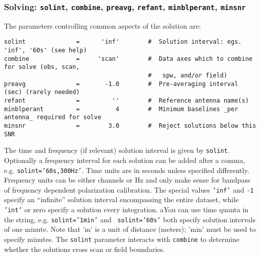 \subsubsection{Solving: {\tt solint}, {\tt combine},
{\tt preavg}, {\tt refant}, {\tt minblperant}, {\tt minsnr} }
\label{section:cal.solve.pars.solving}

The parameters controlling common aspects of the solution are:
\small
\begin{verbatim}
solint              =      'inf'        #  Solution interval: egs. 'inf', '60s' (see help)
combine             =     'scan'        #  Data axes which to combine for solve (obs, scan, 
                                        #   spw, and/or field)
preavg              =       -1.0        #  Pre-averaging interval (sec) (rarely needed)
refant              =         ''        #  Reference antenna name(s)
minblperant         =          4        #  Minimum baselines _per antenna_ required for solve
minsnr              =        3.0        #  Reject solutions below this SNR
\end{verbatim} 
\normalsize

The time and frequency (if relevant) solution interval is given by {\tt solint}. Optionally a
frequency interval for each solution can be added after a comma,
e.g. {\tt solint='60s,300Hz'}. Time units are in seconds unless
specified differently. Frequency units can be either channels or Hz
and only make sense for bandpass of frequency dependent polarization
calibration.  The special values {\tt 'inf'} and {\tt -1} specify an
``infinite'' solution interval encompassing the entire dataset, while
{\tt 'int'} or zero specify a solution every integration.  aYou can
use time quanta in the string, e.g. {\tt solint='1min'} and {\tt
  solint='60s'} both specify solution intervals of one minute.  Note
that 'm' is a unit of distance (meters); 'min' must be used to specify
minutes.  The {\tt solint} parameter interacts with {\tt combine} to
determine whether the solutions cross scan or field boundaries.

